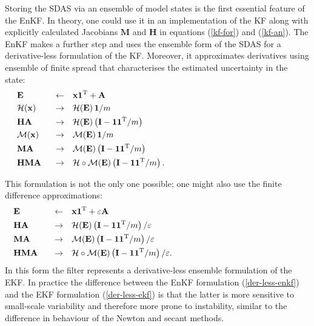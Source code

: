 \documentclass[11pt]{report}
\newcommand{\mb} {\mathbf}
\newcommand{\T}{^{\tiny \mathrm T}}
\begin{document}
Storing the SDAS via an ensemble of model states is the first essential feature of the EnKF.
In theory, one could use it in an implementation of the KF along with explicitly calculated Jacobians $\mb M$ and $\mb H$ in equations (\ref{kf-for}) and (\ref{kf-an}).
The EnKF makes a further step and uses the ensemble form of the SDAS for a derivative-less formulation of the KF.
Moreover, it approximates derivatives using ensemble of finite spread that characterises the estimated uncertainty in the state:
\begin{subequations}
  \label{der-less-enkf}
  \begin{align}
    &\mb E \quad &\leftarrow& \quad \mb x \mb 1 \T  + \mb A \hspace{8cm}\\
    &\mathcal H (\mb x) \quad &\to& \quad \mathcal H (\mb E) \, \mb 1 / m\\
    &\mb H \mb A \quad &\to& \quad \mathcal H(\mb E)\left(\mb I - \mb 1 \mb 1\T / m\right)\\
    &\mathcal M (\mb x) \quad &\to& \quad \mathcal M (\mb E) \, \mb 1 / m\\
    &\mb M \mb A \quad &\to& \quad \mathcal M(\mb E)\left(\mb I - \mb 1 \mb 1\T / m\right)\\
    &\mb H \mb M \mb A &\to& \quad \mathcal H \circ \mathcal M(\mb E) \left(\mb I - \mb 1 \mb 1\T /m \right).
  \end{align}
\end{subequations}

This formulation is not the only one possible; one might also use the finite difference approximations:
\begin{subequations}
  \label{der-less-ekf}
  \begin{align}
    &\mb E \quad &\leftarrow& \quad \mb x \mb 1 \T  + \varepsilon \mb A \hspace{8cm}\\
    &\mb H \mb A \quad &\to& \quad \mathcal H(\mb E)\left(\mb I - \mb 1 \mb 1\T / m\right) / \varepsilon\\
    &\mb M \mb A \quad &\to& \quad \mathcal M(\mb E)\left(\mb I - \mb 1 \mb 1\T / m\right) / \varepsilon\\
    &\mb H \mb M \mb A \quad &\to& \quad \mathcal H \circ \mathcal M(\mb E)\left(\mb I - \mb 1 \mb 1\T / m\right) / \varepsilon.
  \end{align}
\end{subequations}
In this form the filter represents a derivative-less ensemble formulation of the EKF.
In practice the difference between the EnKF formulation (\ref{der-less-enkf}) and the EKF formulation (\ref{der-less-ekf}) is that the latter is more sensitive to small-scale variability and therefore more prone to instability, similar to the difference in behaviour of the Newton and secant methods.
\end{document}
